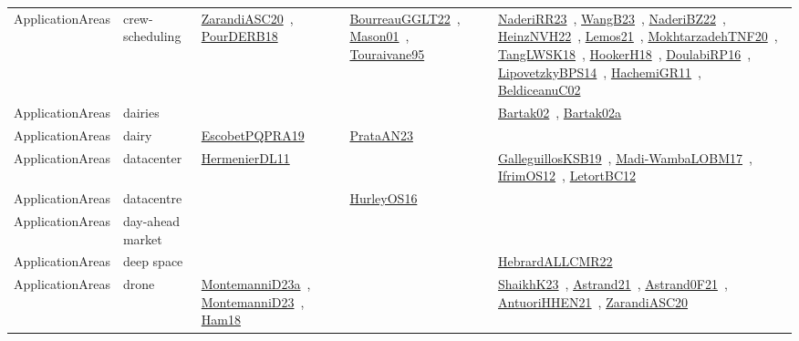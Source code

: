 {\begin{longtable}{lp{3cm}>{\raggedright\arraybackslash}p{6cm}>{\raggedright\arraybackslash}p{6cm}>{\raggedright\arraybackslash}p{8cm}}
ApplicationAreas & crew-scheduling & \href{works/ZarandiASC20.pdf}{ZarandiASC20}~\cite{ZarandiASC20}, \href{works/PourDERB18.pdf}{PourDERB18}~\cite{PourDERB18} & \href{works/BourreauGGLT22.pdf}{BourreauGGLT22}~\cite{BourreauGGLT22}, \href{works/Mason01.pdf}{Mason01}~\cite{Mason01}, \href{works/Touraivane95.pdf}{Touraivane95}~\cite{Touraivane95} & \href{works/NaderiRR23.pdf}{NaderiRR23}~\cite{NaderiRR23}, \href{works/WangB23.pdf}{WangB23}~\cite{WangB23}, \href{works/NaderiBZ22.pdf}{NaderiBZ22}~\cite{NaderiBZ22}, \href{works/HeinzNVH22.pdf}{HeinzNVH22}~\cite{HeinzNVH22}, \href{works/Lemos21.pdf}{Lemos21}~\cite{Lemos21}, \href{works/MokhtarzadehTNF20.pdf}{MokhtarzadehTNF20}~\cite{MokhtarzadehTNF20}, \href{works/TangLWSK18.pdf}{TangLWSK18}~\cite{TangLWSK18}, \href{works/HookerH18.pdf}{HookerH18}~\cite{HookerH18}, \href{works/DoulabiRP16.pdf}{DoulabiRP16}~\cite{DoulabiRP16}, \href{works/LipovetzkyBPS14.pdf}{LipovetzkyBPS14}~\cite{LipovetzkyBPS14}, \href{works/HachemiGR11.pdf}{HachemiGR11}~\cite{HachemiGR11}, \href{works/BeldiceanuC02.pdf}{BeldiceanuC02}~\cite{BeldiceanuC02}\\
ApplicationAreas & dairies &  &  & \href{works/Bartak02.pdf}{Bartak02}~\cite{Bartak02}, \href{works/Bartak02a.pdf}{Bartak02a}~\cite{Bartak02a}\\
ApplicationAreas & dairy & \href{works/EscobetPQPRA19.pdf}{EscobetPQPRA19}~\cite{EscobetPQPRA19} & \href{works/PrataAN23.pdf}{PrataAN23}~\cite{PrataAN23} & \\
ApplicationAreas & datacenter & \href{works/HermenierDL11.pdf}{HermenierDL11}~\cite{HermenierDL11} &  & \href{works/GalleguillosKSB19.pdf}{GalleguillosKSB19}~\cite{GalleguillosKSB19}, \href{works/Madi-WambaLOBM17.pdf}{Madi-WambaLOBM17}~\cite{Madi-WambaLOBM17}, \href{works/IfrimOS12.pdf}{IfrimOS12}~\cite{IfrimOS12}, \href{works/LetortBC12.pdf}{LetortBC12}~\cite{LetortBC12}\\
ApplicationAreas & datacentre &  & \href{works/HurleyOS16.pdf}{HurleyOS16}~\cite{HurleyOS16} & \\
ApplicationAreas & day-ahead market &  &  & \\
ApplicationAreas & deep space &  &  & \href{works/HebrardALLCMR22.pdf}{HebrardALLCMR22}~\cite{HebrardALLCMR22}\\
ApplicationAreas & drone & \href{works/MontemanniD23a.pdf}{MontemanniD23a}~\cite{MontemanniD23a}, \href{works/MontemanniD23.pdf}{MontemanniD23}~\cite{MontemanniD23}, \href{works/Ham18.pdf}{Ham18}~\cite{Ham18} &  & \href{works/ShaikhK23.pdf}{ShaikhK23}~\cite{ShaikhK23}, \href{works/Astrand21.pdf}{Astrand21}~\cite{Astrand21}, \href{works/Astrand0F21.pdf}{Astrand0F21}~\cite{Astrand0F21}, \href{works/AntuoriHHEN21.pdf}{AntuoriHHEN21}~\cite{AntuoriHHEN21}, \href{works/ZarandiASC20.pdf}{ZarandiASC20}~\cite{ZarandiASC20}\\

\end{longtable}}
